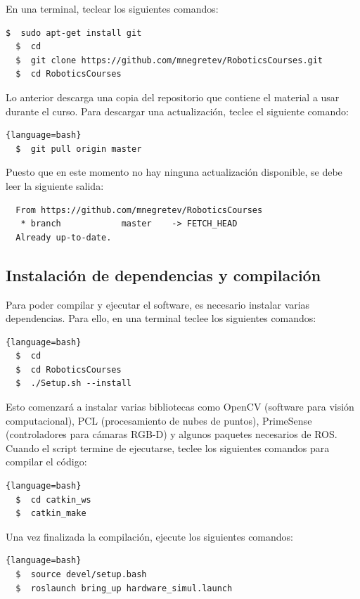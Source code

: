 \documentclass[a4paper,12pt]{article}
\begin{document}
En una terminal, teclear los siguientes comandos:

\begin{lstlisting}[language=bash]
  $  sudo apt-get install git
  $  cd
  $  git clone https://github.com/mnegretev/RoboticsCourses.git
  $  cd RoboticsCourses
\end{lstlisting}

Lo anterior descarga una copia del repositorio que contiene el material a usar durante el curso. Para descargar una actualización, teclee el siguiente comando:

\begin{lstlisting}{language=bash}
  $  git pull origin master
\end{lstlisting}

Puesto que en este momento no hay ninguna actualización disponible, se debe leer la siguiente salida:

\begin{verbatim}
  From https://github.com/mnegretev/RoboticsCourses
   * branch            master    -> FETCH_HEAD
  Already up-to-date.
\end{verbatim}

\subsection{Instalación de dependencias y compilación}
Para poder compilar y ejecutar el software, es necesario instalar varias dependencias. Para ello, en una terminal teclee los siguientes comandos:

\begin{lstlisting}{language=bash}
  $  cd
  $  cd RoboticsCourses
  $  ./Setup.sh --install
\end{lstlisting}

Esto comenzará a instalar varias bibliotecas como OpenCV (software para visión computacional), PCL (procesamiento de nubes de puntos), PrimeSense (controladores para cámaras RGB-D) y algunos paquetes necesarios de ROS. Cuando el script termine de ejecutarse, teclee los siguientes comandos para compilar el código:

\begin{lstlisting}{language=bash}
  $  cd catkin_ws
  $  catkin_make
\end{lstlisting}

Una vez finalizada la compilación, ejecute los siguientes comandos:

\begin{lstlisting}{language=bash}
  $  source devel/setup.bash
  $  roslaunch bring_up hardware_simul.launch
\end{lstlisting}
\end{document}
